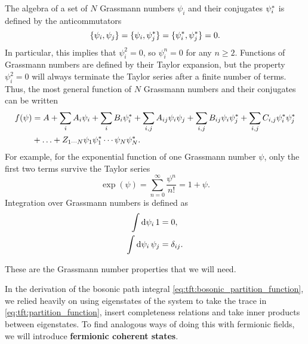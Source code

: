 The algebra of a set of $N$ Grassmann numbers $\psi_i$ and their conjugates ${\psi}^*_i$ is defined by the anticommutators
\begin{equation}
	\{ \psi_i , \psi_j \} = 
	\{ \psi_i , {\psi}^*_j \} = 
	\{ {\psi}^*_i , {\psi}^*_j \} = 
	0 .
\label{eq:gnums:anticommutators}
\end{equation}
In particular, this implies that $\psi_i^2 = 0$, so $\psi_i^n = 0$ for any $n \geq 2$.
Functions of Grassmann numbers are defined by their Taylor expansion, but the property $\psi_i^2 = 0$ will always terminate the Taylor series after a finite number of terms.
Thus, the most general function of $N$ Grassmann numbers and their conjugates can be written
\begin{equation}
\begin{split}
	f(\psi) &= A + \sum_i A_i \psi_i + \sum_i B_i {\psi}^*_i + \sum_{i,j} A_{ij} \psi_i \psi_j + \sum_{i,j} B_{ij} \psi_i {\psi}^*_j + \sum_{i,j} C_{i,j} {\psi}^*_i {\psi}^*_j \\
	        &+ \ldots + Z_{1 \cdots N} \psi_1 {\psi}^*_1 \cdots \psi_N {\psi}^*_N .
\end{split}
\label{eq:gnums:function_taylor_series}
\end{equation}
For example, for the exponential function of one Grassmann number $\psi$, only the first two terms survive the Taylor series
\begin{equation}
	\exp(\psi) = \sum_{n=0}^\infty \frac{\psi^n}{n!} = 1 + \psi .
\label{eq:gnums:exponential_taylor_series}
\end{equation}
Integration over Grassmann numbers is defined as
\begin{subequations}
\begin{align}
	\iffalse \pdv{1}{\psi_i}      &= 0,           & \qquad \fi \int \dif \psi_i \, 1      &= 0,            \label{eq:gnums:integration_const} \\
	\iffalse \pdv{\psi_j}{\psi_i} &= \delta_{ij}, & \qquad \fi \int \dif \psi_i \, \psi_j &= \delta_{ij} . \label{eq:gnums:integration_var}   
\end{align}
\end{subequations}
\iffalse
Note that $\int \dif \psi \, f(\psi) = \int \dif \psi \, [f(0) + f'(0) \psi] = f'(0) = \pdv{f(\psi)}/{\psi}$, so integration and differentiation are effectively identical operations.
\fi
These are the Grassmann number properties that we will need.

In the derivation of the bosonic path integral \eqref{eq:tft:bosonic_partition_function}, we relied heavily on using eigenstates of the system to take the trace in \eqref{eq:tft:partition_function}, insert completeness relations and take inner products between eigenstates.
To find analogous ways of doing this with fermionic fields, we will introduce \textbf{fermionic coherent states}.

